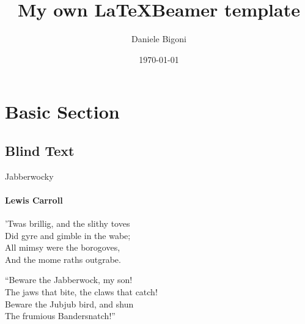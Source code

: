 \documentclass[aspectratio=169]{beamer}
\title{My own \LaTeX Beamer template }
\date[\today]{\today}
\author[Bigoni]{Daniele Bigoni}
\begin{document}
\begin{frame}
\titlepage
\end{frame}

\section{Basic Section}
\subsection{Blind Text}
\begin{frame}{Jabberwocky}
    \framesubtitle{Lewis Carroll}%
    'Twas brillig, and the slithy toves\\
    Did gyre and gimble in the wabe;\\
    All mimsy were the borogoves,\\
    And the mome raths outgrabe.\\\bigskip

    “Beware the Jabberwock, my son!\\
    The jaws that bite, the claws that catch!\\
    Beware the Jubjub bird, and shun\\
    The frumious Bandersnatch!”\\
\end{frame}
\end{document}

